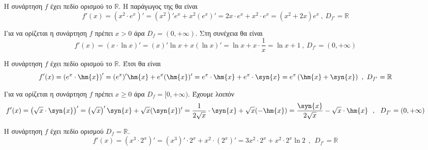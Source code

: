 \begin{alist}
\item Η συνάρτηση $ f $ έχει πεδίο ορισμού το $ \mathbb{R} $. Η παράγωγος της θα είναι
\[ f'(x)=\left(x^2\cdot e^x\right)'=\left(x^2\right)'e^x+x^2(e^x)'=2x\cdot e^x+x^2\cdot e^x=\left(x^2+2x\right)e^x\ ,\ D_{f'}=\mathbb{R} \]
\item Για να ορίζεται η συνάρτηση $ f $ πρέπει $ x>0 $ άρα $ D_f = (0,+\infty) $. Στη συνέχεια θα είναι
\[ f'(x)=\left(x\cdot \ln{x}\right)'=(x)'\ln{x}+x\left(\ln{x}\right)'=\ln{x}+x\cdot\frac{1}{x}=\ln{x}+1\ ,\ D_{f'}=(0,+\infty) \]
\item Η συνάρτηση $ f $ έχει πεδίο ορισμού το $ \mathbb{R} $. Έτσι θα είναι
\[ f'(x)=\left(e^x\cdot\hm{x}\right)'=(e^x)'\hm{x}+e^x(\hm{x})'=e^x\cdot\hm{x}+e^x\cdot\syn{x}=e^x\left(\hm{x}+\syn{x}\right)\ ,\ D_{f'}=\mathbb{R} \]
\item Για να ορίζεται η συνάρτηση $ f $ πρέπει $ x\geq 0 $ άρα $ D_f=[0,+\infty) $. Έχουμε λοιπόν
\[ f'(x)=\left(\sqrt{x}\cdot\syn{x}\right)'=\left(\sqrt{x}\right)'\syn{x}+\sqrt{x}(\syn{x})'=\frac{1}{2\sqrt{x}}\cdot\syn{x}+\sqrt{x}(-\hm{x})=\frac{\syn{x}}{2\sqrt{x}}-\sqrt{x}\cdot\hm{x}\ \ ,\ \ D_{f'}=(0,+\infty) \]
\item Η συνάρτηση $ f $ έχει πεδίο ορισμού $ D_f=\mathbb{R} $.
\[ f'(x)=\left(x^3\cdot2^x\right)'=(x^3)'\cdot2^x+x^2\cdot(2^x)'=3x^2\cdot 2^x+x^2\cdot2^x\ln{2}\ \ ,\ \ D_{f'}=\mathbb{R} \]
\end{alist}
